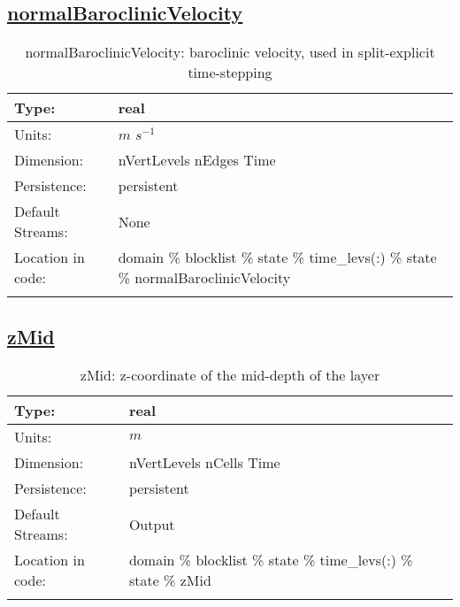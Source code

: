 \subsection[normalBaroclinicVelocity]{\hyperref[sec:var_tab_state]{normalBaroclinicVelocity}}
\label{subsec:var_sec_state_normalBaroclinicVelocity}
\begin{center}
\begin{longtable}{| p{2.0in} | p{4.0in} |}
        \hline 
        Type: & real \\
        \hline 
        Units: & $m$ $s^{-1}$ \\
        \hline 
        Dimension: & nVertLevels nEdges Time \\
        \hline 
        Persistence: & persistent \\
        \hline 
		 Default Streams: & None \\
        \hline 
		 Location in code: & domain \% blocklist \% state \% time\_levs(:) \% state \% normalBaroclinicVelocity \\
		 \hline 
    \caption{normalBaroclinicVelocity: baroclinic velocity, used in split-explicit time-stepping}
\end{longtable}
\end{center}
\subsection[zMid]{\hyperref[sec:var_tab_state]{zMid}}
\label{subsec:var_sec_state_zMid}
\begin{center}
\begin{longtable}{| p{2.0in} | p{4.0in} |}
        \hline 
        Type: & real \\
        \hline 
        Units: & $m$ \\
        \hline 
        Dimension: & nVertLevels nCells Time \\
        \hline 
        Persistence: & persistent \\
        \hline 
		 Default Streams: & Output  \\
        \hline 
		 Location in code: & domain \% blocklist \% state \% time\_levs(:) \% state \% zMid \\
		 \hline 
    \caption{zMid: z-coordinate of the mid-depth of the layer}
\end{longtable}
\end{center}
